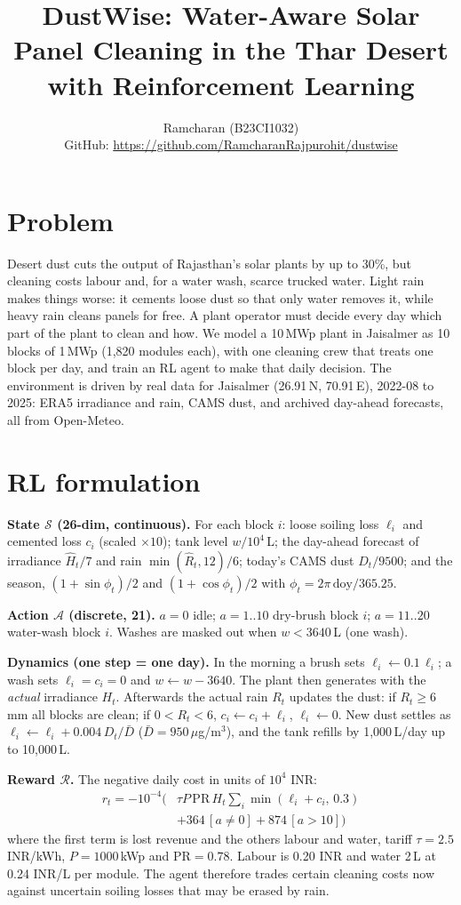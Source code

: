 \documentclass[10pt,twocolumn]{article}
\title{\vspace{-1.2cm}\textbf{DustWise: Water-Aware Solar Panel Cleaning in the Thar Desert with Reinforcement Learning}\vspace{-0.3cm}}
\author{\small
Ramcharan (B23CI1032)\\
\small GitHub: \url{https://github.com/RamcharanRajpurohit/dustwise}}
\date{\vspace{-0.9cm}}
\begin{document}
\maketitle

\section{Problem}
Desert dust cuts the output of Rajasthan's solar plants by up to 30\%, but cleaning costs labour and, for a water wash, scarce trucked water. Light rain makes things worse: it cements loose dust so that only water removes it, while heavy rain cleans panels for free. A plant operator must decide every day which part of the plant to clean and how. We model a 10\,MWp plant in Jaisalmer as 10 blocks of 1\,MWp (1,820 modules each), with one cleaning crew that treats one block per day, and train an RL agent to make that daily decision. The environment is driven by real data for Jaisalmer (26.91\,N, 70.91\,E), 2022-08 to 2025: ERA5 irradiance and rain, CAMS dust, and archived day-ahead forecasts, all from Open-Meteo.

\section{RL formulation}
\textbf{State $\mathcal{S}$ (26-dim, continuous).} For each block $i$: loose soiling loss $\ell_i$ and cemented loss $c_i$ (scaled $\times10$); tank level $w/10^4$\,L; the day-ahead forecast of irradiance $\hat H_t/7$ and rain $\min(\hat R_t,12)/6$; today's CAMS dust $D_t/9500$; and the season, $(1+\sin\phi_t)/2$ and $(1+\cos\phi_t)/2$ with $\phi_t=2\pi\,\mathrm{doy}/365.25$.

\textbf{Action $\mathcal{A}$ (discrete, 21).} $a=0$ idle; $a=1..10$ dry-brush block $i$; $a=11..20$ water-wash block $i$. Washes are masked out when $w<3640$\,L (one wash).

\textbf{Dynamics (one step = one day).} In the morning a brush sets $\ell_i\leftarrow0.1\,\ell_i$; a wash sets $\ell_i=c_i=0$ and $w\leftarrow w-3640$. The plant then generates with the \emph{actual} irradiance $H_t$. Afterwards the actual rain $R_t$ updates the dust: if $R_t\ge6$\,mm all blocks are clean; if $0<R_t<6$, $c_i\leftarrow c_i+\ell_i$, $\ell_i\leftarrow0$. New dust settles as $\ell_i\leftarrow\ell_i+0.004\,D_t/\bar D$ ($\bar D=950\,\mu$g/m$^3$), and the tank refills by 1,000\,L/day up to 10,000\,L.

\textbf{Reward $\mathcal{R}$.} The negative daily cost in units of $10^4$ INR:
\begin{align*}
r_t=-10^{-4}\Big(&\tau P\,\mathrm{PR}\,H_t\textstyle\sum_i\min(\ell_i+c_i,\,0.3)\\
&+364\,[a\neq0]+874\,[a>10]\Big)
\end{align*}
where the first term is lost revenue and the others labour and water,
tariff $\tau=2.5$ INR/kWh, $P=1000$\,kWp and $\mathrm{PR}=0.78$. Labour is 0.20 INR and water 2\,L at 0.24 INR/L per module. The agent therefore trades certain cleaning costs now against uncertain soiling losses that may be erased by rain.
\end{document}
